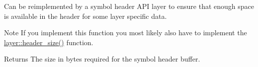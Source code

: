 Can be reimplemented by a symbol header A\-P\-I layer to ensure that enough space is available in the header for some layer specific data. 

\begin{DoxyNote}{Note}
If you implement this function you most likely also have to implement the \hyperlink{group__codec__header__api_gaee83194d70603b13eeaa786ca6e9cdeb}{layer\-::header\-\_\-size()} function.
\end{DoxyNote}
\begin{DoxyReturn}{Returns}
The size in bytes required for the symbol header buffer. 
\end{DoxyReturn}
